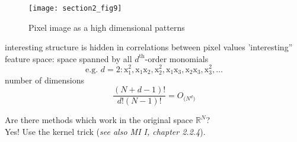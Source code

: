 \begin{figure}[h]
  \centering
\texttt{[image: section2\_fig9]}  
  \caption{Pixel image as a high dimensional patterns}
  \label{fig:pixelImage}
\end{figure}


\begin{itemize}
  \itl interesting structure is hidden in correlations between pixel 
  values
  \itl 'interesting'' feature space: space spanned by all 
  $d^{\mathrm{th}}$-order monomials
  \begin{equation}
    \text{e.g. } d = 2: 
    \mathrm{x}_1^2, \mathrm{x}_1 \mathrm{x}_2, 
    \mathrm{x}_2^2, \mathrm{x}_1 \mathrm{x}_3, 
    \mathrm{x}_2 \mathrm{x}_3, \mathrm{x}_3^2, \ldots
  \end{equation}
  \itl number of dimensions
  \begin{equation}
    \frac{ (N+d-1)! }{ d!(N-1)! } 
    = O_{ \big( N^d \big) }
  \end{equation}
\end{itemize}
Are there methods which work in the original space $\mathbb{R}^N$? \\
Yes! Use the kernel trick ({\it see also MI I, chapter 2.2.4}).

